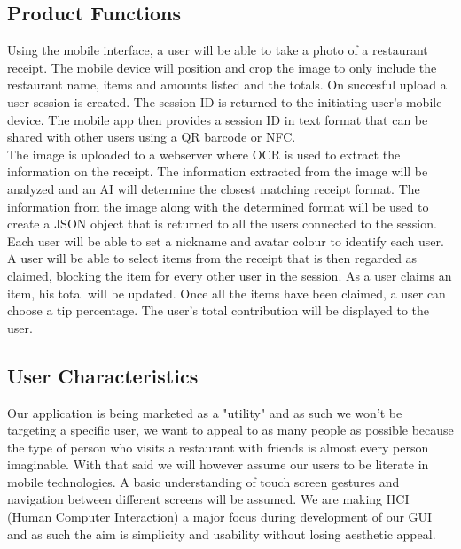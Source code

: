 \documentclass[12pt,a4paper]{article}
\begin{document}
   	\subsection{Product Functions}
		Using the mobile interface, a user will be able to take a photo of a restaurant receipt. The mobile device will position and crop the image to only include the restaurant name, items and amounts listed and the totals. On succesful upload a user session is created. The session ID is returned to the initiating user's mobile device. The mobile app then provides a session ID in text format that can be shared with other users using a QR barcode or NFC.\\
		The image is uploaded to a webserver where OCR is used to extract the information on the receipt. The information extracted from the image will be analyzed and an AI will determine the closest matching receipt format. The information from the image along with the determined format will be used to create a JSON object that is returned to all the users connected to the session.\\
		Each user will be able to set a nickname and avatar colour to identify each user. A user will be able to select items from the receipt that is then regarded as claimed, blocking the item for every other user in the session. As a user claims an item, his total will be updated. Once all the items have been claimed, a user can choose a tip percentage. The user's total contribution will be displayed to the user.
   	
	\subsection{User Characteristics}

		Our application is being marketed as a "utility" and as such we won't be targeting a specific user, we want to appeal to as many people as possible because the type of person who visits a restaurant with friends is almost every person imaginable. With that said we will however assume our users to be literate in mobile technologies. A basic understanding of touch screen gestures and navigation between different screens will be assumed. We are making HCI (Human Computer Interaction) a major focus during development of our GUI and as such the aim is simplicity and usability without losing aesthetic appeal.
		
\end{document}
